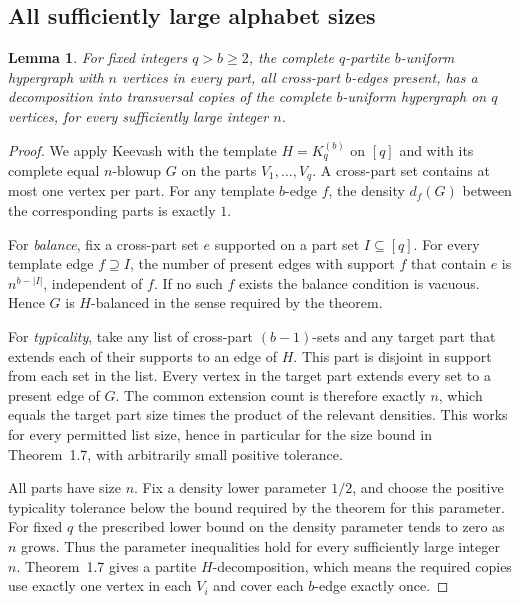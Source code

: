 \documentclass[11pt,a4paper]{article}
\newtheorem{SourceRbdTlemma}[SourceRbdTtheorem]{Lemma}
\begin{document}
\subsection{All sufficiently large alphabet sizes}
\begin{SourceRbdTlemma}\label{R13T:oa}
For fixed integers $q>b\ge2$, the complete $q$-partite $b$-uniform hypergraph with $n$ vertices in every part, all cross-part $b$-edges present, has a decomposition into transversal copies of the complete $b$-uniform hypergraph on $q$ vertices, for every sufficiently large integer $n$.
\end{SourceRbdTlemma}
\begin{proof}
We apply Keevash \cite[Definition~1.6 and Theorem~1.7]{R13T:Keevash} with the template $H=K_q^{(b)}$ on $[q]$ and with its complete equal $n$-blowup $G$ on the parts $V_1,\ldots,V_q$. A cross-part set contains at most one vertex per part. For any template $b$-edge $f$, the density $d_f(G)$ between the corresponding parts is exactly $1$.

For \emph{balance}, fix a cross-part set $e$ supported on a part set $I\subseteq[q]$. For every template edge $f\supseteq I$, the number of present edges with support $f$ that contain $e$ is $n^{b-|I|}$, independent of $f$. If no such $f$ exists the balance condition is vacuous. Hence $G$ is $H$-balanced in the sense required by the theorem.

For \emph{typicality}, take any list of cross-part $(b-1)$-sets and any target part that extends each of their supports to an edge of $H$. This part is disjoint in support from each set in the list. Every vertex in the target part extends every set to a present edge of $G$. The common extension count is therefore exactly $n$, which equals the target part size times the product of the relevant densities. This works for every permitted list size, hence in particular for the size bound in Theorem~1.7, with arbitrarily small positive tolerance.

All parts have size $n$. Fix a density lower parameter $1/2$, and choose the positive typicality tolerance below the bound required by the theorem for this parameter. For fixed $q$ the prescribed lower bound on the density parameter tends to zero as $n$ grows. Thus the parameter inequalities hold for every sufficiently large integer $n$. Theorem~1.7 gives a partite $H$-decomposition, which means the required copies use exactly one vertex in each $V_i$ and cover each $b$-edge exactly once.
\end{proof}
\end{document}
